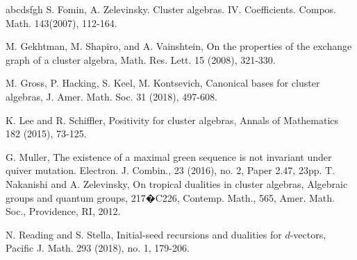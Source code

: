 \documentclass[14pt]{amsart}
\begin{document}
\begin{thebibliography}{abcdsfgh}
 S. Fomin, A. Zelevinsky. Cluster algebras. IV. Coefficients. Compos. Math. 143(2007), 112-164.

M. Gekhtman, M. Shapiro, and  A. Vainshtein, On the properties of the exchange
graph of a cluster algebra, Math. Res. Lett. 15 (2008), 321-330.


 M. Gross, P. Hacking, S. Keel, M. Kontsevich, Canonical bases for cluster algebras,  J. Amer. Math. Soc. 31 (2018), 497-608.



 K. Lee and R. Schiffler, Positivity for cluster algebras, Annals of Mathematics 182 (2015), 73-125.

 G. Muller, The existence of a maximal green sequence is not invariant under quiver mutation. Electron. J. Combin., 23 (2016), no. 2, Paper 2.47, 23pp.
T. Nakanishi and A. Zelevinsky, On tropical dualities in cluster algebras, Algebraic groups and quantum groups, 217�C226, Contemp. Math., 565, Amer. Math. Soc., Providence, RI, 2012.


 N. Reading and S. Stella, Initial-seed recursions and dualities for $d$-vectors, Pacific J. Math. 293 (2018), no. 1, 179-206.



\end{thebibliography}
\end{document}
